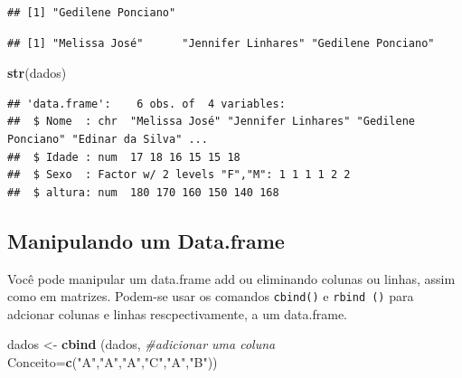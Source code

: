 \documentclass[
]{book}
\newenvironment{Shaded}{\begin{snugshade}}{\end{snugshade}}
\newcommand{\CommentTok}[1]{\textcolor[rgb]{0.56,0.35,0.01}{\textit{#1}}}
\newcommand{\DataTypeTok}[1]{\textcolor[rgb]{0.13,0.29,0.53}{#1}}
\newcommand{\DecValTok}[1]{\textcolor[rgb]{0.00,0.00,0.81}{#1}}
\newcommand{\KeywordTok}[1]{\textcolor[rgb]{0.13,0.29,0.53}{\textbf{#1}}}
\newcommand{\NormalTok}[1]{#1}
\newcommand{\OperatorTok}[1]{\textcolor[rgb]{0.81,0.36,0.00}{\textbf{#1}}}
\newcommand{\StringTok}[1]{\textcolor[rgb]{0.31,0.60,0.02}{#1}}
\begin{document}
\begin{verbatim}
## [1] "Gedilene Ponciano"
\end{verbatim}

\begin{Shaded}
\end{Shaded}

\begin{verbatim}
## [1] "Melissa José"      "Jennifer Linhares" "Gedilene Ponciano"
\end{verbatim}

\begin{Shaded}
\begin{Highlighting}[]
\KeywordTok{str}\NormalTok{(dados)}
\end{Highlighting}
\end{Shaded}

\begin{verbatim}
## 'data.frame':    6 obs. of  4 variables:
##  $ Nome  : chr  "Melissa José" "Jennifer Linhares" "Gedilene Ponciano" "Edinar da Silva" ...
##  $ Idade : num  17 18 16 15 15 18
##  $ Sexo  : Factor w/ 2 levels "F","M": 1 1 1 1 2 2
##  $ altura: num  180 170 160 150 140 168
\end{verbatim}

\hypertarget{manipulando-um-data.frame}{%
\subsection{Manipulando um Data.frame}\label{manipulando-um-data.frame}}

Você pode manipular um data.frame add ou eliminando colunas ou linhas, assim como em matrizes. Podem-se usar os comandos \texttt{cbind()} e \texttt{rbind\ ()} para adcionar colunas e linhas rescpectivamente, a um data.frame.

\begin{Shaded}
\begin{Highlighting}[]
\NormalTok{dados <-}\StringTok{ }\KeywordTok{cbind}\NormalTok{ (dados, }\CommentTok{#adicionar uma coluna}
               \DataTypeTok{Conceito=}\KeywordTok{c}\NormalTok{(}\StringTok{"A"}\NormalTok{,}\StringTok{"A"}\NormalTok{,}\StringTok{"A"}\NormalTok{,}\StringTok{"C"}\NormalTok{,}\StringTok{"A"}\NormalTok{,}\StringTok{"B"}\NormalTok{))}
\end{Highlighting}
\end{Shaded}
\end{document}
